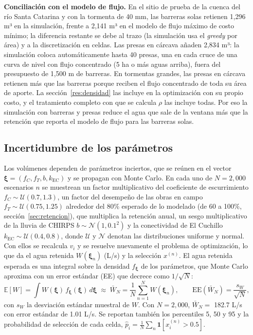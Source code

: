 \documentclass[11pt,letterpaper]{article}
\begin{document}
\textbf{Conciliación con el modelo de flujo.} En el sitio de prueba de la cuenca del río Santa Catarina y con la tormenta de 40 mm, las barreras solas retienen 1,296 m³ en la simulación, frente a 2,141 m³ en el modelo de flujo máximo de costo mínimo; la diferencia restante se debe al trazo (la simulación usa el \emph{greedy} por área) y a la discretización en celdas. Las presas en cárcava añaden 2,834 m³: la simulación coloca automáticamente hasta 40 presas, una en cada cruce de una curva de nivel con flujo concentrado (5 ha o más aguas arriba), fuera del presupuesto de 1,500 m de barreras. En tormentas grandes, las presas en cárcava retienen más que las barreras porque reciben el flujo concentrado de toda su área de aporte. La sección~\ref{res:densidad} las incluye en la optimización con su propio costo, y el tratamiento completo con que se calcula $\rho$ las incluye todas. Por eso la simulación con barreras y presas reduce el agua que sale de la ventana más que la retención que reporta el modelo de flujo para las barreras solas.

\subsection{Incertidumbre de los parámetros}\label{sec:incertidumbre}

Los volúmenes dependen de parámetros inciertos, que se reúnen en el vector $\boldsymbol\xi=(f_C,f_T,b,k_{\text{EC}})$ y se propagan con Monte Carlo. En cada uno de $N=2{,}000$ escenarios $n$ se muestrean un factor multiplicativo del coeficiente de escurrimiento $f_C\sim\mathcal U(0.7,1.3)$, un factor del desempeño de las obras en campo $f_T\sim\mathcal U(0.75,1.25)$ alrededor del 80\% esperado de lo modelado (de 60 a 100\%, sección~\ref{sec:retencion}), que multiplica la retención anual, un sesgo multiplicativo de la lluvia de CHIRPS $b\sim\mathcal N(1,0.1^2)$ y la conectividad de El Cuchillo $k_{\text{EC}}\sim\mathcal U(0.4,0.8)$, donde $\mathcal U$ y $\mathcal N$ denotan las distribuciones uniforme y normal. Con ellos se recalcula $v_i$ y se resuelve nuevamente el problema de optimización, lo que da el agua retenida $W(\boldsymbol\xi_n)$ (L/s) y la selección $x^{(n)}$. El agua retenida esperada es una integral sobre la densidad $f_{\boldsymbol\xi}$ de los parámetros, que Monte Carlo aproxima con un error estándar (EE) que decrece como $1/\sqrt N$:
\begin{equation}
\mathbb E[W]=\int W(\boldsymbol\xi)\,f_{\boldsymbol\xi}(\boldsymbol\xi)\,d\boldsymbol\xi\;\approx\;\bar W_N=\frac1N\sum_{n=1}^{N}W(\boldsymbol\xi_n),\qquad \text{EE}(\bar W_N)=\frac{s_W}{\sqrt N},
\end{equation}
con $s_W$ la desviación estándar muestral de $W$. Con $N=2{,}000$, $\bar W_N=$ 182.7 L/s con error estándar de 1.01 L/s. Se reportan también los percentiles 5, 50 y 95 y la probabilidad de selección de cada celda, $\hat p_i = \frac1N\sum_n \mathbf 1[x_i^{(n)}>0.5]$.
\end{document}
